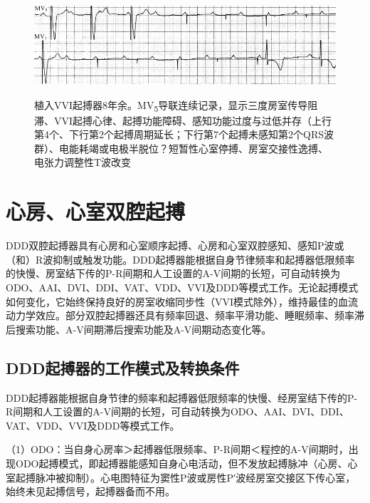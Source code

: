 \begin{figure}[!htbp]
 \centering
 \includegraphics[width=5.58333in,height=1.45833in]{./images/Image00624.jpg}
 \captionsetup{justification=centering}
 \caption{植入VVI起搏器8年余。MV\textsubscript{5}导联连续记录，显示三度房室传导阻滞、VVI起搏心律、起搏功能障碍、感知功能过度与过低并存（上行第4个、下行第2个起搏周期延长；下行第7个起搏未感知第2个QRS波群）、电能耗竭或电极半脱位？短暂性心室停搏、房室交接性逸搏、电张力调整性T波改变}
 \label{fig38-21}
  \end{figure} 


\protect\hypertarget{text00045.htmlux5cux23subid493}{}{}

\section{心房、心室双腔起搏}

DDD双腔起搏器具有心房和心室顺序起搏、心房和心室双腔感知、感知P波或（和）R波抑制或触发功能。DDD起搏器能根据自身节律频率和起搏器低限频率的快慢、房室结下传的P-R间期和人工设置的A-V间期的长短，可自动转换为ODO、AAI、DVI、DDI、VAT、VDD、VVI及DDD等模式工作。无论起搏模式如何变化，它始终保持良好的房室收缩同步性（VVI模式除外），维持最佳的血流动力学效应。部分双腔起搏器还具有频率回退、频率平滑功能、睡眠频率、频率滞后搜索功能、A-V间期滞后搜索功能及A-V间期动态变化等。

\protect\hypertarget{text00045.htmlux5cux23subid494}{}{}

\subsection{DDD起搏器的工作模式及转换条件}

DDD起搏器能根据自身节律的频率和起搏器低限频率的快慢、经房室结下传的P-R间期和人工设置的A-V间期的长短，可自动转换为ODO、AAI、DVI、DDI、VAT、VDD、VVI及DDD等模式工作。

（1）ODO：当自身心房率＞起搏器低限频率、P-R间期＜程控的A-V间期时，出现ODO起搏模式，即起搏器能感知自身心电活动，但不发放起搏脉冲（心房、心室起搏脉冲被抑制）。心电图特征为窦性P波或房性P′波经房室交接区下传心室，始终未见起搏信号，起搏器备而不用。


